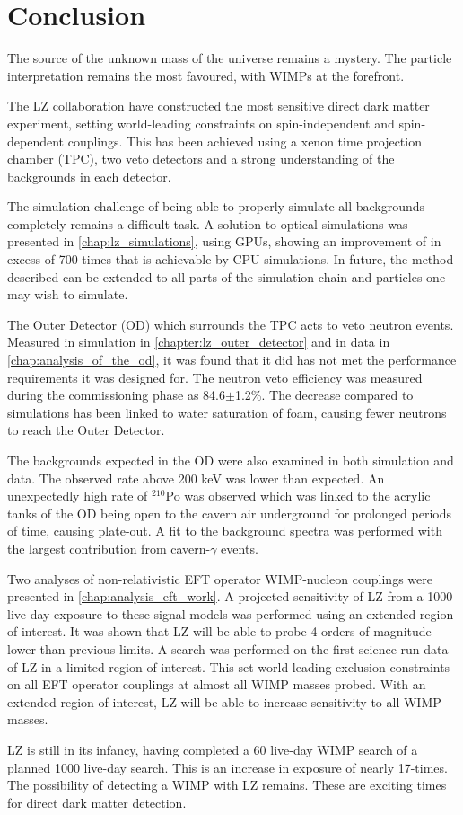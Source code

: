 \chapter{Conclusion}
\par
The source of the unknown mass of the universe remains a mystery.
The particle interpretation remains the most favoured, with WIMPs at the forefront.
\par
The LZ collaboration have constructed the most sensitive direct dark matter experiment, setting world-leading constraints on spin-independent and spin-dependent couplings.
This has been achieved using a xenon time projection chamber (TPC), two veto detectors and a strong understanding of the backgrounds in each detector.

\par
The simulation challenge of being able to properly simulate all backgrounds completely remains a difficult task.
A solution to optical simulations was presented in \autoref{chap:lz_simulations}, using GPUs, showing an improvement of in excess of 700-times that is achievable by CPU simulations.
In future, the method described can be extended to all parts of the simulation chain and particles one may wish to simulate.

\par
The Outer Detector (OD) which surrounds the TPC acts to veto neutron events.
Measured in simulation in \autoref{chapter:lz_outer_detector} and in data in \autoref{chap:analysis_of_the_od}, it was found that it did has not met the performance requirements it was designed for.
The neutron veto efficiency was measured during the commissioning phase as 84.6$\pm$1.2\%.
The decrease compared to simulations has been linked to water saturation of foam, causing fewer neutrons to reach the Outer Detector.
\par
The backgrounds expected in the OD were also examined in both simulation and data.
The observed rate above 200 keV was lower than expected.
An unexpectedly high rate of ${}^{210}$Po was observed which was linked to the acrylic tanks of the OD being open to the cavern air underground for prolonged periods of time, causing plate-out.
A fit to the background spectra was performed with the largest contribution from cavern-$\gamma$ events.

\par
Two analyses of non-relativistic EFT operator WIMP-nucleon couplings were presented in \autoref{chap:analysis_eft_work}.
A projected sensitivity of LZ from a 1000 live-day exposure to these signal models was performed using an extended region of interest.
It was shown that LZ will be able to probe 4 orders of magnitude lower than previous limits.
A search was performed on the first science run data of LZ in a limited region of interest.
This set world-leading exclusion constraints on all EFT operator couplings at almost all WIMP masses probed.
With an extended region of interest, LZ will be able to increase sensitivity to all WIMP masses.

\par
LZ is still in its infancy, having completed a 60 live-day WIMP search of a planned 1000 live-day search.
This is an increase in exposure of nearly 17-times.
The possibility of detecting a WIMP with LZ remains.
These are exciting times for direct dark matter detection.
